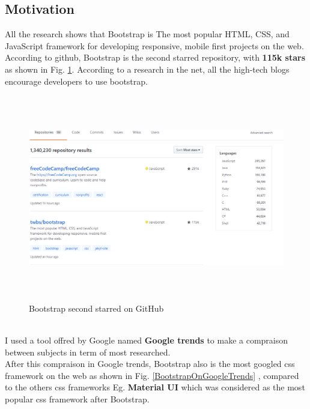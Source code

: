 	\subsection{Motivation}
	All the research shows that Bootstrap is The most popular HTML, CSS, and JavaScript framework for developing responsive, mobile first projects  on the web.\\According to github, Bootstrap is the second starred repository, with \textbf{115k stars} as shown in Fig. \ref{BootstrapSecondStarredOnGitHub}.
	According to a research in the net, all the high-tech blogs encourage developers to use bootstrap.
		\begin{figure}[h]
		\centering
		\includegraphics[width=15.5cm,height=9cm]{Boostrap_statics_github.png}
		\caption{Bootstrap second starred on GitHub}
		\label{BootstrapSecondStarredOnGitHub}
	\end{figure}
\\
 I used a tool offred by Google named \textbf{Google trends} to make a compraison between subjects in term of most researched.
 \\
 After this compraison in Google trends, Bootstrap also is the most googled css framework on the web as shown in Fig. \ref{BootstrapOnGoogleTrends} , compared to the others css frameworks Eg. \textbf{Material UI} which was considered as the most popular css framework after Bootstrap.

